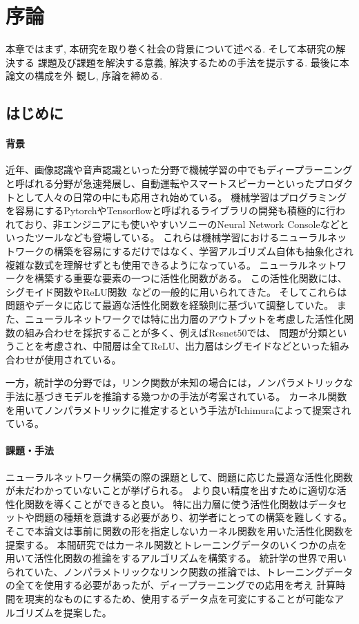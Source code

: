 \chapter{序論}
\label{introduction}

本章ではまず, 本研究を取り巻く社会の背景について述べる. そして本研究の解決する
課題及び課題を解決する意義, 解決するための手法を提示する. 最後に本論文の構成を外
観し, 序論を締める.

\section{はじめに}
\label{introduction:background}

\subsubsection{背景}


近年、画像認識や音声認識といった分野で機械学習の中でもディープラーニングと呼ばれる分野が急速発展し、自動運転やスマートスピーカーといったプロダクトとして人々の日常の中にも応用され始めている。
機械学習はプログラミングを容易にするPytorchやTensorflowと呼ばれるライブラリの開発も積極的に行われており、非エンジニアにも使いやすいソニーのNeural Network Consoleなどといったツールなども登場している。
これらは機械学習におけるニューラルネットワークの構築を容易にするだけではなく、学習アルゴリズム自体も抽象化され複雑な数式を理解せずとも使用できるようになっている。
ニューラルネットワークを構築する重要な要素の一つに活性化関数がある。
この活性化関数には、シグモイド関数やReLU関数~\cite{ReLU}などの一般的に用いられてきた。
そしてこれらは問題やデータに応じて最適な活性化関数を経験則に基づいて調整していた。
また、ニューラルネットワークでは特に出力層のアウトプットを考慮した活性化関数の組み合わせを採択することが多く、例えばResnet50では、
問題が分類ということを考慮され、中間層は全てReLU、出力層はシグモイドなどといった組み合わせが使用されている。

一方，統計学の分野では，リンク関数が未知の場合には，ノンパラメトリックな手法に基づきモデルを推論する幾つかの手法が考案されている。
カーネル関数を用いてノンパラメトリックに推定するという手法がIchimuraによって提案されている。

\subsubsection{課題・手法}

ニューラルネットワーク構築の際の課題として、問題に応じた最適な活性化関数が未だわかっていないことが挙げられる。
より良い精度を出すために適切な活性化関数を導くことができると良い。
特に出力層に使う活性化関数はデータセットや問題の種類を意識する必要があり、初学者にとっての構築を難しくする。
そこで本論文は事前に関数の形を指定しないカーネル関数を用いた活性化関数を提案する。
本間研究ではカーネル関数とトレーニングデータのいくつかの点を用いて活性化関数の推論をするアルゴリズムを構築する。
統計学の世界で用いられていた、ノンパラメトリックなリンク関数の推論では、トレーニングデータの全てを使用する必要があったが、ディープラーニングでの応用を考え
計算時間を現実的なものにするため、使用するデータ点を可変にすることが可能なアルゴリズムを提案した。

